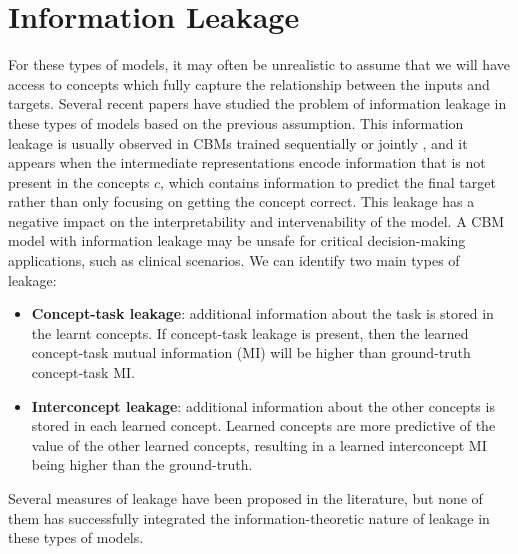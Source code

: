 \section{Information Leakage}   
For these types of models, it may often be unrealistic to assume that we will have access to concepts which fully capture the 
relationship between the inputs and targets. Several recent papers have studied the problem of information leakage in these types 
of models based on the previous assumption. This information leakage is usually observed in CBMs trained sequentially or jointly 
\cite{margeloiu2021conceptbottleneckmodelslearn, mahinpei2021promisespitfallsblackboxconcept}, and it appears when the intermediate 
representations encode information that is not present in the concepts $c$, which contains information to predict the final target 
rather than only focusing on getting the concept correct. This leakage has a negative impact on the interpretability and intervenability 
of the model. A CBM model with information leakage may be unsafe for critical decision-making applications, such as clinical scenarios. 
\cite{parisini2026leakageinterpretabilityconceptbasedmodels} We can identify two main types of leakage:   
\begin{itemize}
    \item \textbf{Concept-task leakage}: additional information about the task is stored in the learnt concepts. If concept-task 
    leakage is present, then the learned concept-task mutual information (MI) will be higher than ground-truth concept-task MI. 
    \item \textbf{Interconcept leakage}: additional information about the other concepts is stored in each learned concept. Learned 
    concepts are more predictive of the value of the other learned concepts, resulting in a learned interconcept MI being higher 
    than the ground-truth. 
\end{itemize} 
Several measures of leakage have been proposed in the literature, but none of them has successfully integrated the information-theoretic 
nature of leakage in these types of models. 
